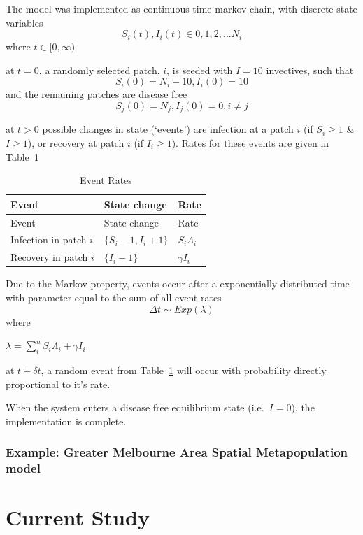 \documentclass[
  letterpaper,
  DIV=11,
  numbers=noendperiod]{scrreprt}
\begin{document}
The model was implemented as continuous time markov chain, with discrete
state variables \[S_{i}(t), I_{i}(t) \in {0,1,2,...N_{i}}\] where
\(t\in [0, \infty)\)

at \(t = 0\), a randomly selected patch, \(i\), is seeded with
\(I = 10\) invectives, such that
\[S_{i}(0) = N_{i} - 10, I_{i}(0) = 10\] and the remaining patches are
disease free \[S_j(0) = N_j, I_j(0) =0, i\neq j \]

at \(t>0\) possible changes in state (`events') are infection at a patch
\(i\) (if \(S_i \geq 1\) \& \(I \geq 1\)), or recovery at patch \(i\)
(if \(I_i \geq 1\)). Rates for these events are given in
Table~\ref{tbl-EventRates}

\hypertarget{tbl-EventRates}{}
\begin{longtable}[]{@{}lll@{}}
\caption{\label{tbl-EventRates}Event Rates}\tabularnewline
\toprule\noalign{}
Event & State change & Rate \\
\midrule\noalign{}
\endfirsthead
\toprule\noalign{}
Event & State change & Rate \\
\midrule\noalign{}
\endhead
\bottomrule\noalign{}
\endlastfoot
Infection in patch \(i\) & \(\{S_i -1, I_i +1\}\) & \(S_i \Lambda_i\) \\
Recovery in patch \(i\) & \(\{I_i - 1\}\) & \(\gamma I_i\) \\
\end{longtable}

Due to the Markov property, events occur after a exponentially
distributed time with parameter equal to the sum of all event rates
\[\Delta t \sim Exp(\lambda)\] where

\(\lambda = \sum\limits_{i}^{n}S_i \Lambda_i + \gamma I_i\)

at \(t + \delta t\), a random event from Table~\ref{tbl-EventRates} will
occur with probability directly proportional to it's rate.

When the system enters a disease free equilibrium state
(i.e.~\(I = 0\)), the implementation is complete.

\hypertarget{sec-MossGmelb}{%
\section{Example: Greater Melbourne Area Spatial Metapopulation
model}\label{sec-MossGmelb}}

\part{Current Study}
\end{document}
